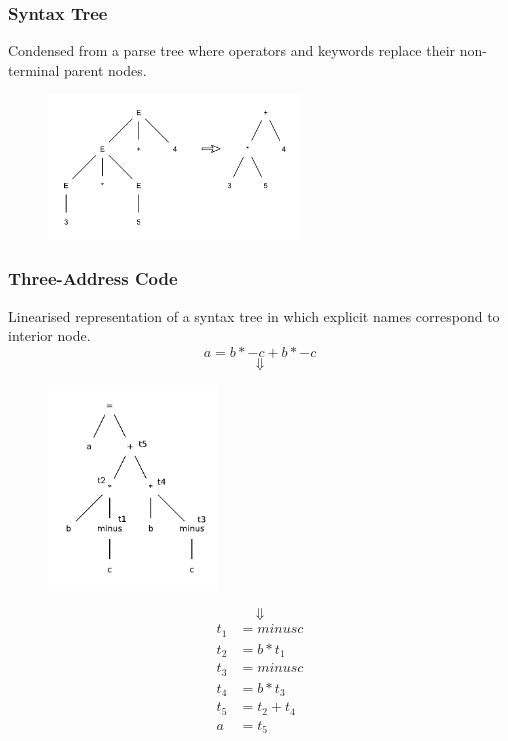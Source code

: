 \subsubsection{Syntax Tree}
Condensed from a parse tree where operators and keywords replace their non-terminal parent nodes.
\begin{figure}[H]
    \centerline{\includegraphics[width=0.6\textwidth]{img/15.pdf}}
\end{figure}

\subsubsection{Three-Address Code}
Linearised representation of a syntax tree in which explicit names correspond to interior node.
$$
    a = b \ast -c + b \ast -c
$$
$$
    \Downarrow
$$
\begin{figure}[H]
    \centerline{\includegraphics[width=0.4\textwidth]{img/16.pdf}}
\end{figure}
$$
    \Downarrow
$$
\begin{align*}
    t_1 &= minus c \\
    t_2 &= b \ast t_1 \\
    t_3 &= minus c \\
    t_4 &= b \ast t_3 \\
    t_5 &= t_2 + t_4 \\
    a &= t_5
\end{align*}

